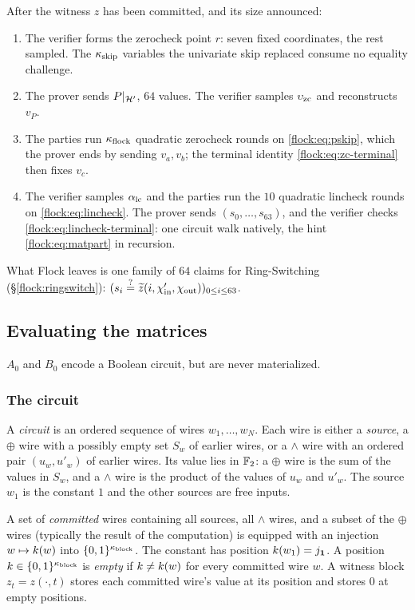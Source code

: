 \begin{protocol}\label{flock:protocol}
After the witness $z$ has been committed, and its size announced:
\begin{enumerate}
\item The verifier forms the zerocheck point $r$: seven fixed coordinates, the rest sampled. The $\kappa_{\mathrm{skip}}$ variables the univariate skip replaced consume no equality challenge.
\item The prover sends $P|_{\mathcal{H}'}$, $64$ values. The verifier samples $\upsilon_{\mathrm{zc}}$ and reconstructs $v_P$.
\item The parties run $\kappa_{\mathrm{flock}}$ quadratic zerocheck rounds on \eqref{flock:eq:pskip}, which the prover ends by sending $v_a,v_b$; the terminal identity \eqref{flock:eq:zc-terminal} then fixes $v_c$.
\item The verifier samples $\alpha_{\mathrm{lc}}$ and the parties run the $10$ quadratic lincheck rounds on \eqref{flock:eq:lincheck}. The prover sends $(s_0,\ldots,s_{63})$, and the verifier checks \eqref{flock:eq:lincheck-terminal}: one circuit walk natively, the hint \eqref{flock:eq:matpart} in recursion.
\end{enumerate}
What Flock leaves is one family of $64$ claims for Ring-Switching (\S\ref{flock:ringswitch}): $(s_i \stackrel{?}{=} \widetilde{z}(i, \chi'_{\mathrm{in}},\chi_{\mathrm{out}}))_{0 \leq i \leq 63}$.
\end{protocol}

\subsection{Evaluating the matrices}\label{flock:matrices}

$A_0$ and $B_0$ encode a Boolean circuit, but are never materialized.

\subsubsection{The circuit}\label{flock:circuit}

\begin{definition}[Circuit]\label{def:circuit}
A \emph{circuit} is an ordered sequence of wires $w_1,\ldots,w_N$. Each wire is either a \emph{source}, a $\oplus$ wire with a possibly empty set $S_w$ of earlier wires, or a $\wedge$ wire with an ordered pair $(u_w,u'_w)$ of earlier wires. Its value lies in $\mathbb{F}_2$: a $\oplus$ wire is the sum of the values in $S_w$, and a $\wedge$ wire is the product of the values of $u_w$ and $u'_w$. The source $w_1$ is the constant $1$ and the other sources are free inputs.

A set of \emph{committed} wires containing all sources, all $\wedge$ wires, and a subset of the $\oplus$ wires (typically the result of the computation) is equipped with an injection $w\mapsto k(w)$ into $\{0,1\}^{\kappa_{\mathrm{block}}}$. The constant has position $k(w_1)=j_{\mathbf{1}}$. A position $k\in\{0,1\}^{\kappa_{\mathrm{block}}}$ is \emph{empty} if $k\neq k(w)$ for every committed wire $w$. A witness block $z_t=z(\cdot,t)$ stores each committed wire's value at its position and stores $0$ at empty positions.
\end{definition}

